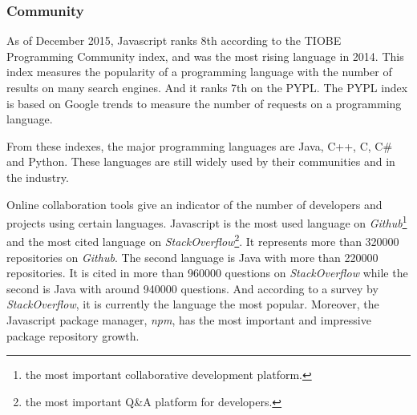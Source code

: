 \subsubsection{Community}%
As of December 2015, Javascript ranks 8th according to the TIOBE Programming Community index, and was the most rising language in 2014.
This index measures the popularity of a programming language with the number of results on many search engines.
And it ranks 7th on the PYPL.
The PYPL index is based on Google trends to measure the number of requests on a programming language.

From these indexes, the major programming languages are Java, C++, C, C\# and Python.
These languages are still widely used by their communities and in the industry.

\begin{figure}
\end{figure}


Online collaboration tools give an indicator of the number of developers and projects using certain languages.
Javascript is the most used language on \textit{Github}\footnote{the most important collaborative development platform.} and the most cited language on \textit{StackOverflow}\footnote{the most important Q\&A platform for developers.}.
It represents more than \num{320000} repositories on \textit{Github}.
The second language is Java with more than \num{220000} repositories.
It is cited in more than \num{960000} questions on \textit{StackOverflow} while the second is Java with around \num{940000} questions.
And according to a survey by \textit{StackOverflow}, it is currently the language the most popular.
Moreover, the Javascript package manager, \textit{npm}, has the most important and impressive package repository growth.

